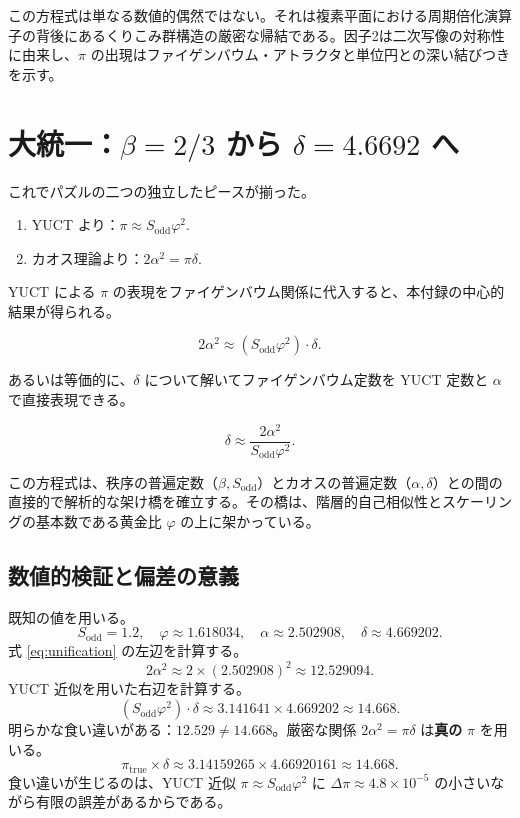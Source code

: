 \documentclass[11pt,a4paper]{article}
\begin{document}
	この方程式は単なる数値的偶然ではない。それは複素平面における周期倍化演算子の背後にあるくりこみ群構造の厳密な帰結である。因子2は二次写像の対称性に由来し、\(\pi\) の出現はファイゲンバウム・アトラクタと単位円との深い結びつきを示す。
	
	\section{大統一：\(\beta = 2/3\) から \(\delta = 4.6692\) へ}
	
	これでパズルの二つの独立したピースが揃った。
	\begin{enumerate}
		\item YUCT より：\(\pi \approx S_{\mathrm{odd}}\varphi^2\).
		\item カオス理論より：\(2\alpha^2 = \pi \delta\).
	\end{enumerate}
	
	YUCT による \(\pi\) の表現をファイゲンバウム関係に代入すると、本付録の中心的結果が得られる。
	
	\begin{equation}
		\boxed{2\alpha^2 \approx (S_{\mathrm{odd}}\varphi^2) \cdot \delta}.
		\label{eq:unification}
	\end{equation}
	
	あるいは等価的に、\(\delta\) について解いてファイゲンバウム定数を YUCT 定数と \(\alpha\) で直接表現できる。
	
	\begin{equation}
		\delta \approx \frac{2\alpha^2}{S_{\mathrm{odd}}\varphi^2}.
	\end{equation}
	
	この方程式は、秩序の普遍定数（\(\beta, S_{\mathrm{odd}}\)）とカオスの普遍定数（\(\alpha, \delta\)）との間の直接的で解析的な架け橋を確立する。その橋は、階層的自己相似性とスケーリングの基本数である黄金比 \(\varphi\) の上に架かっている。
	
	\subsection{数値的検証と偏差の意義}
	
	既知の値を用いる。
	\[
	S_{\mathrm{odd}} = 1.2, \quad \varphi \approx 1.618034, \quad \alpha \approx 2.502908, \quad \delta \approx 4.669202.
	\]
	式 \eqref{eq:unification} の左辺を計算する。
	\[
	2\alpha^2 \approx 2 \times (2.502908)^2 \approx 12.529094.
	\]
	YUCT 近似を用いた右辺を計算する。
	\[
	(S_{\mathrm{odd}}\varphi^2) \cdot \delta \approx 3.141641 \times 4.669202 \approx 14.668.
	\]
	明らかな食い違いがある：\(12.529 \neq 14.668\)。厳密な関係 \(2\alpha^2 = \pi \delta\) は\textbf{真の} \(\pi\) を用いる。
	\[
	\pi_{\mathrm{true}} \times \delta \approx 3.14159265 \times 4.66920161 \approx 14.668.
	\]
	食い違いが生じるのは、YUCT 近似 \(\pi \approx S_{\mathrm{odd}}\varphi^2\) に \(\Delta\pi \approx 4.8\times10^{-5}\) の小さいながら有限の誤差があるからである。
	
\end{document}
